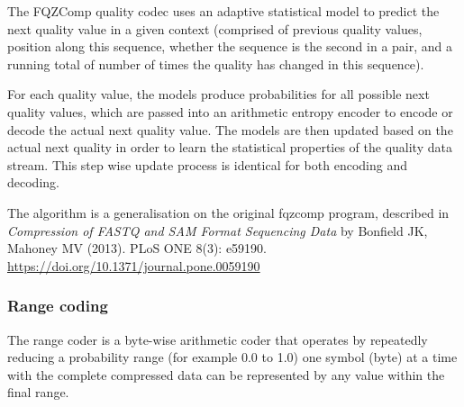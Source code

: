\documentclass[a4paper]{article}
\begin{document}
%
%
%
%
%
%
%
%

The FQZComp quality codec uses an adaptive statistical model to
predict the next quality value in a given context (comprised of
previous quality values, position along this sequence, whether the
sequence is the second in a pair, and a running total of number of
times the quality has changed in this sequence).

For each quality value, the models produce probabilities for all
possible next quality values, which are passed into an arithmetic
entropy encoder to encode or decode the actual next quality value.
The models are then updated based on the actual next quality in order
to learn the statistical properties of the quality data stream.  This
step wise update process is identical for both encoding and decoding.

The algorithm is a generalisation on the original fqzcomp program,
described in \textit{Compression of FASTQ and SAM Format Sequencing
  Data} by Bonfield JK, Mahoney MV (2013). PLoS ONE 8(3):
e59190. \url{https://doi.org/10.1371/journal.pone.0059190}

\subsubsection*{Range coding}

The range coder is a byte-wise arithmetic coder that operates by
repeatedly reducing a probability range (for example 0.0 to 1.0) one
symbol (byte) at a time with the complete compressed data can be
represented by any value within the final range.
\end{document}
